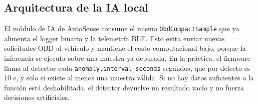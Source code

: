 \documentclass[12pt,letterpaper]{report}
\begin{document}
\subsection{Arquitectura de la IA local}

El módulo de IA de AutoSense consume el mismo \texttt{ObdCompactSample} que ya alimenta el logger binario y la telemetría BLE. Esto evita enviar nuevas solicitudes OBD al vehículo y mantiene el costo computacional bajo, porque la inferencia se ejecuta sobre una muestra ya depurada. En la práctica, el firmware llama al detector cada \texttt{anomaly.interval\_seconds} segundos, que por defecto es 10 s, y solo si existe al menos una muestra válida. Si no hay datos suficientes o la función está deshabilitada, el detector devuelve un resultado vacío y no fuerza decisiones artificiales.
\end{document}
